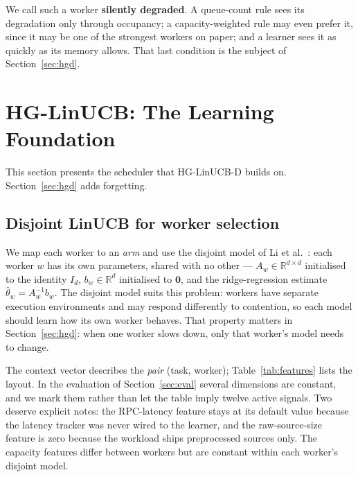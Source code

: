 \documentclass[final,5p,times,twocolumn]{elsarticle}
\begin{document}
We call such a worker \textbf{silently degraded}. A queue-count rule sees its degradation only through occupancy; a capacity-weighted rule may even prefer it, since it may be one of the strongest workers on paper; and a learner sees it as quickly as its memory allows. That last condition is the subject of Section~\ref{sec:hgd}.

\section{HG-LinUCB: The Learning Foundation}
\label{sec:hglinucb}

This section presents the scheduler that HG-LinUCB-D builds on. Section~\ref{sec:hgd} adds forgetting.

\subsection{Disjoint LinUCB for worker selection}

We map each worker to an \emph{arm} and use the disjoint model of Li et al.~\cite{li2010}: each worker $w$ has its own parameters, shared with no other --- $A_w\in\mathbb{R}^{d\times d}$ initialised to the identity $I_d$, $b_w\in\mathbb{R}^d$ initialised to $\mathbf{0}$, and the ridge-regression estimate $\hat{\theta}_w=A_w^{-1}b_w$. The disjoint model suits this problem: workers have separate execution environments and may respond differently to contention, so each model should learn how its own worker behaves. That property matters in Section~\ref{sec:hgd}: when one worker slows down, only that worker's model needs to change.

The context vector describes the \emph{pair} (task, worker); Table~\ref{tab:features} lists the layout. In the evaluation of Section~\ref{sec:eval} several dimensions are constant, and we mark them rather than let the table imply twelve active signals. Two deserve explicit notes: the RPC-latency feature stays at its default value because the latency tracker was never wired to the learner, and the raw-source-size feature is zero because the workload ships preprocessed sources only. The capacity features differ between workers but are constant within each worker's disjoint model.
\end{document}
